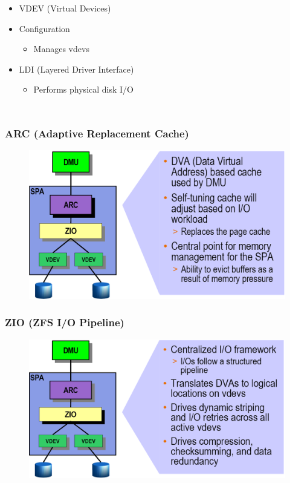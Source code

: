 \begin{frame}[fragile]
\begin{columns}[c]
\begin{itemize}
          \item VDEV (Virtual Devices)
  
          \item Configuration
        \begin{itemize}
            \item Manages vdevs
        \end{itemize}
  
          \item LDI (Layered Driver Interface) 
        \begin{itemize}
            \item Performs physical disk I/O
        \end{itemize}
      \end{itemize}

    \end{columns}
\end{frame}
\begin{frame}[fragile]
    \frametitle{ARC (Adaptive Replacement Cache)}
    \begin{figure}
    \includegraphics[width=0.8\linewidth]{figs/ZFS-arc.png}
    \end{figure}
\end{frame}
% 
% 
\begin{frame}[fragile]
    \frametitle{ZIO (ZFS I/O Pipeline)}
    \begin{figure}
    \includegraphics[width=0.85\linewidth]{figs/ZFS-zio.png}
    \end{figure}
\end{frame}
